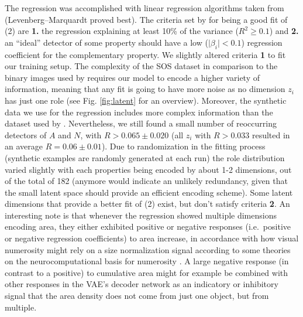 \documentclass[twocolumn]{article}
\begin{document}
\noindent The regression was accomplished with linear regression algorithms taken
from \citet{newville2016lmfit} (Levenberg--Marquardt proved best). The
criteria set by \citet{stoianov2012} for being a good fit of (2)
are \textbf{1.} the regression explaining at least 10\% of the variance
(\(R^2 \geq 0.1\)) and \textbf{2.}  an ``ideal'' detector of some
property should have a low (\(\mid\beta_i\mid < 0.1\)) regression
coefficient for the complementary property. We slightly altered criteria
\textbf{1} to fit our training setup. The complexity of the SOS
dataset in comparison to the binary images used by \citet{stoianov2012}
requires our model to encode a higher variety of information, meaning
that any fit is going to have more noise as no dimension \(z_i\) has just one
role (see Fig. \ref{fig:latent} for an overview). Moreover, the synthetic data we
use for the regression includes more complex information than the
dataset used by \citet{stoianov2012}. Nevertheless, we still found a
small number of reoccurring detectors of \(A\) and \(N\), with
\(R > 0.065 \pm 0.020\) (all \(z_i\) with \(R > 0.033\) resulted in an
average \(R= 0.06 \pm 0.01\)). Due to randomization in the fitting
process (synthetic examples are randomly generated at each run) the role
distribution varied slightly with each properties being encoded by about
1-2 dimensions, out of the total of 182 (anymore would indicate an
unlikely redundancy, given that the small latent space should provide an
efficient encoding scheme). Some latent dimensions that provide a better
fit of (2) exist, but don't satisfy criteria \textbf{2}. An
interesting note is that whenever the regression showed multiple
dimensions encoding area, they either exhibited positive or negative
responses (i.e.~positive or negative regression coefficients) to area
increase, in accordance with how visual numerosity might rely on a size
normalization signal according to some theories on the
neurocomputational basis for numerosity \citep[for a discussion, see][]{stoianov2012}. A large negative response (in contrast to a
positive) to cumulative area might for example be combined with other
responses in the VAE's decoder network as an indicatory or inhibitory
signal that the area density does not come from just one object, but
from multiple.
\end{document}

